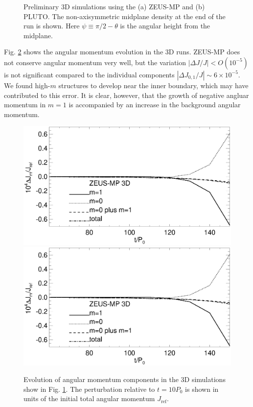 \begin{figure}
\begin{center}
{    }
  \end{center}
  \caption{Preliminary 3D simulations using the (a) ZEUS-MP and (b)
    PLUTO. The non-axisymmetric midplane density at the end of the run
    is shown. Here $\psi \equiv \pi/2 - \theta$ is the angular height
    from the midplane.\label{3d_prelim}}   
\end{figure}


Fig. \ref{3d_prelim_angmom} shows the angular momentum evolution in
the 3D runs. ZEUS-MP does not conserve angular momentum very well, but
the variation $|\Delta J/J|< O(10^{-5})$ is not significant compared
to the individual components $|\Delta J_{0,1}/J|\sim
6\times10^{-5}$. We found high-$m$ structures to develop near the
inner boundary, which may have contributed to this error. It
is clear, however, that the growth of negative angluar momentum in
$m=1$ is accompanied by an increase in the background angular
momentum. 

\begin{figure}
  \includegraphics[scale=0.41,clip=true,trim=0cm 1.75cm 0cm 0cm]{figures/nonaxi_evol_ang_zeus}
  \includegraphics[scale=0.41]{figures/nonaxi_evol_ang_zeus}
  \caption{Evolution of angular momentum components in the 3D 
    simulations show in Fig. \ref{3d_prelim}. The perturbation
    relative to $t=10P_0$ is shown in units of the initial total
    angular momentum $J_\mathrm{ref}$.\label{3d_prelim_angmom}} 
\end{figure}   

